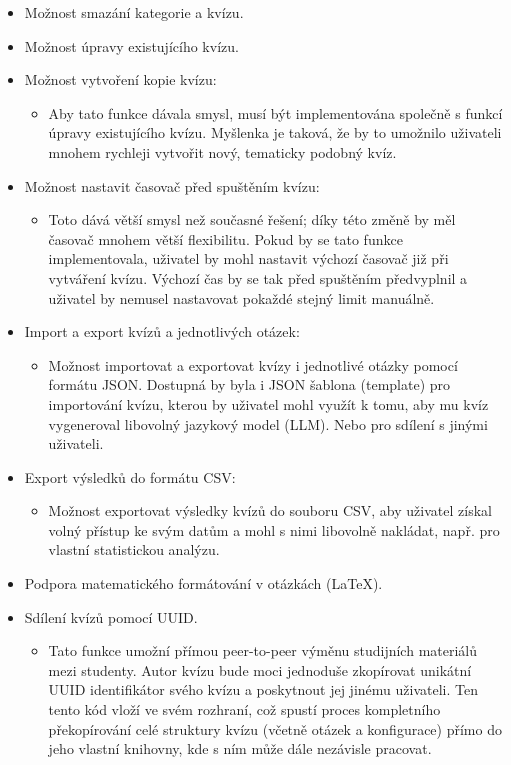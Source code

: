 \documentclass{vskpou} %
\begin{document}
\begin{itemize}
    \item Možnost smazání kategorie a kvízu.
    \item Možnost úpravy existujícího kvízu.
    \item Možnost vytvoření kopie kvízu:
    \begin{itemize}
        \item Aby tato funkce dávala smysl, musí být implementována společně s funkcí úpravy existujícího kvízu. Myšlenka je taková, že by to umožnilo uživateli mnohem rychleji vytvořit nový, tematicky podobný kvíz.
    \end{itemize}
    \item Možnost nastavit časovač před spuštěním kvízu:
    \begin{itemize}
        \item Toto dává větší smysl než současné řešení; díky této změně by měl časovač mnohem větší flexibilitu. Pokud by se tato funkce implementovala, uživatel by mohl nastavit výchozí časovač již při vytváření kvízu. Výchozí čas by se tak před spuštěním předvyplnil a uživatel by nemusel nastavovat pokaždé stejný limit manuálně.
    \end{itemize}
    \item Import a export kvízů a jednotlivých otázek:
    \begin{itemize}
        \item Možnost importovat a exportovat kvízy i jednotlivé otázky pomocí formátu JSON. Dostupná by byla i JSON šablona (template) pro importování kvízu, kterou by uživatel mohl využít k tomu, aby mu kvíz vygeneroval libovolný jazykový model (LLM). Nebo pro sdílení s jinými uživateli.
    \end{itemize}
    \item Export výsledků do formátu CSV:
    \begin{itemize}
        \item Možnost exportovat výsledky kvízů do souboru CSV, aby uživatel získal volný přístup ke svým datům a mohl s nimi libovolně nakládat, např. pro vlastní statistickou analýzu.
    \end{itemize}
    \item Podpora matematického formátování v otázkách (LaTeX).
    \item Sdílení kvízů pomocí UUID.
        \begin{itemize}
        \item Tato funkce umožní přímou peer-to-peer výměnu studijních materiálů mezi studenty. Autor kvízu bude moci jednoduše zkopírovat unikátní UUID identifikátor svého kvízu a poskytnout jej jinému uživateli. Ten tento kód vloží ve svém rozhraní, což spustí proces kompletního překopírování celé struktury kvízu (včetně otázek a konfigurace) přímo do jeho vlastní knihovny, kde s ním může dále nezávisle pracovat.
    \end{itemize}
\end{itemize}
\end{document}
